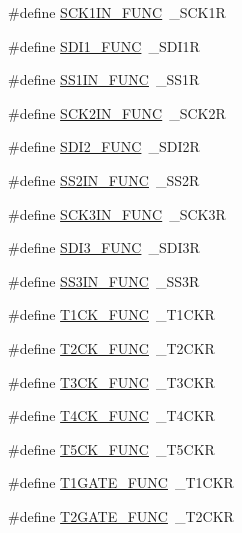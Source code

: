 \begin{DoxyCompactItemize}
\item 
\#define \hyperlink{pps-macro_8h_adce45eccb73e9f2f75ba6e7ef77f2d60}{S\+C\+K1\+I\+N\+\_\+\+F\+U\+N\+C}~\+\_\+\+S\+C\+K1\+R
\item 
\#define \hyperlink{pps-macro_8h_aead867220c643b18f9797b2d8cdf228f}{S\+D\+I1\+\_\+\+F\+U\+N\+C}~\+\_\+\+S\+D\+I1\+R
\item 
\#define \hyperlink{pps-macro_8h_a3a31ab04be5f54df78dba9285c7271c1}{S\+S1\+I\+N\+\_\+\+F\+U\+N\+C}~\+\_\+\+S\+S1\+R
\item 
\#define \hyperlink{pps-macro_8h_a5371ec419d80a18b670bab045838dcfa}{S\+C\+K2\+I\+N\+\_\+\+F\+U\+N\+C}~\+\_\+\+S\+C\+K2\+R
\item 
\#define \hyperlink{pps-macro_8h_a48c42f0763d4b12aa194304310c6f316}{S\+D\+I2\+\_\+\+F\+U\+N\+C}~\+\_\+\+S\+D\+I2\+R
\item 
\#define \hyperlink{pps-macro_8h_a7725dd4f262510e8991aecac03af01c9}{S\+S2\+I\+N\+\_\+\+F\+U\+N\+C}~\+\_\+\+S\+S2\+R
\item 
\#define \hyperlink{pps-macro_8h_aa7f6e1bb8768fc55aae9764646082148}{S\+C\+K3\+I\+N\+\_\+\+F\+U\+N\+C}~\+\_\+\+S\+C\+K3\+R
\item 
\#define \hyperlink{pps-macro_8h_ac16de750ed182c5973d9b82412e8ff38}{S\+D\+I3\+\_\+\+F\+U\+N\+C}~\+\_\+\+S\+D\+I3\+R
\item 
\#define \hyperlink{pps-macro_8h_afe34b1479faba1e8ff507b4f0dce1c68}{S\+S3\+I\+N\+\_\+\+F\+U\+N\+C}~\+\_\+\+S\+S3\+R
\item 
\#define \hyperlink{pps-macro_8h_a794a87354daa554bcd4c22e381582fde}{T1\+C\+K\+\_\+\+F\+U\+N\+C}~\+\_\+\+T1\+C\+K\+R
\item 
\#define \hyperlink{pps-macro_8h_ae1786e0ed93bd9555db43c0729dcaf6f}{T2\+C\+K\+\_\+\+F\+U\+N\+C}~\+\_\+\+T2\+C\+K\+R
\item 
\#define \hyperlink{pps-macro_8h_a14b73712963fec1b549b2bb2a7346f88}{T3\+C\+K\+\_\+\+F\+U\+N\+C}~\+\_\+\+T3\+C\+K\+R
\item 
\#define \hyperlink{pps-macro_8h_a257546c53b00a2e9fafa2b5ba36057e9}{T4\+C\+K\+\_\+\+F\+U\+N\+C}~\+\_\+\+T4\+C\+K\+R
\item 
\#define \hyperlink{pps-macro_8h_adc59be81afbd1289402baa70423e74bd}{T5\+C\+K\+\_\+\+F\+U\+N\+C}~\+\_\+\+T5\+C\+K\+R
\item 
\#define \hyperlink{pps-macro_8h_a37673ad7538f53d925e8ef0c1524aca2}{T1\+G\+A\+T\+E\+\_\+\+F\+U\+N\+C}~\+\_\+\+T1\+C\+K\+R
\item 
\#define \hyperlink{pps-macro_8h_a83ff1bfe6b9874e8acb6e9e19b21a2ac}{T2\+G\+A\+T\+E\+\_\+\+F\+U\+N\+C}~\+\_\+\+T2\+C\+K\+R

\end{DoxyCompactItemize}

